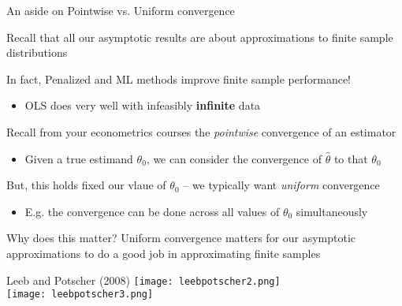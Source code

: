 \documentclass[notes,11pt, aspectratio=169]{beamer}
\newenvironment{wideitemize}{\itemize\addtolength{\itemsep}{10pt}}{\enditemize}
\begin{document}
\begin{frame}{An aside on Pointwise vs. Uniform convergence}
  \begin{wideitemize}
    \item Recall that all our asymptotic results are about approximations to finite sample distributions
    \item In fact, Penalized and ML methods improve finite sample performance!
      \begin{itemize}
      \item OLS does very well with infeasibly \textbf{infinite} data
      \end{itemize}
    \item Recall from your econometrics courses the
      \emph{pointwise} convergence of an estimator
      \begin{itemize}
      \item Given a true estimand $\theta_{0}$, we can consider the
        convergence of $\hat{\theta}$ to that $\theta_{0}$
      \end{itemize}
    \item But, this holds fixed our vlaue of $\theta_{0}$ -- we
      typically want \emph{uniform} convergence
      \begin{itemize}
      \item E.g. the convergence can be done across all values of
        $\theta_{0}$ simultaneously
      \end{itemize}
    \item Why does this matter? Uniform convergence matters for
      our asymptotic approximations to do a good job in approximating
      finite samples
  \end{wideitemize}
\end{frame}

\begin{frame}{Leeb and Potscher (2008)}
  \texttt{[image: leebpotscher2.png]}\\
  \texttt{[image: leebpotscher3.png]}
\end{frame}
\end{document}
